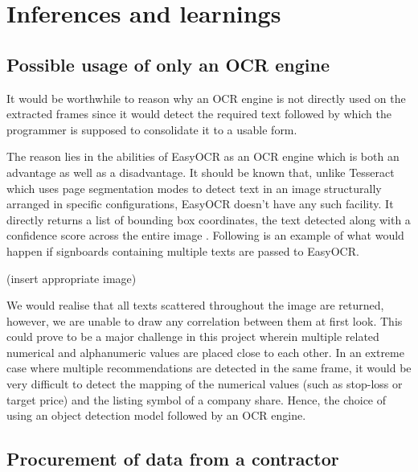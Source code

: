 \section{Inferences and learnings}

\subsection{Possible usage of only an OCR engine}

It would be worthwhile to reason why an OCR engine is not directly used on the extracted frames since it would detect the required text followed by which the programmer is supposed to consolidate it to a usable form. \par

The reason lies in the abilities of EasyOCR as an OCR engine which is both an advantage as well as a disadvantage. It should be known that, unlike Tesseract which uses page segmentation modes \cite{Rosebroc2021} to detect text in an image structurally arranged in specific configurations, EasyOCR doesn’t have any such facility. It directly returns a list of bounding box coordinates, the text detected along with a confidence score across the entire image \cite{Jaided}. Following is an example of what would happen if signboards containing multiple texts are passed to EasyOCR.

(insert appropriate image)

We would realise that all texts scattered throughout the image are returned, however, we are unable to draw any correlation between them at first look. This could prove to be a major challenge in this project wherein multiple related numerical and alphanumeric values are placed close to each other. In an extreme case where multiple recommendations are detected in the same frame, it would be very difficult to detect the mapping of the numerical values (such as stop-loss or target price) and the listing symbol of a company share. Hence, the choice of using an object detection model followed by an OCR engine.

\subsection{Procurement of data from a contractor}

